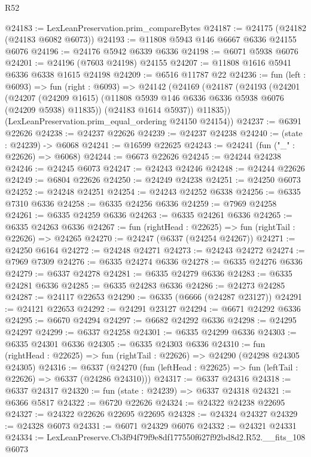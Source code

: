 \begin{lexlean}{R52}
\begin{coremodule}
@24183 := LexLeanPreservation.prim_compareBytes
@24187 := @24175 (@24182 (@24183 @6082 @6073))
@24193 := @11808 @5943 @146 @6667 @6336 @24155 @6076
@24196 := @24176 @5942 @6339 @6336
@24198 := @6071 @5938 @6076
@24201 := @24196 (@7603 @24198) @24155
@24207 := @11808 @1616 @5941 @6336 @6338 @1615 @24198
@24209 := @6516 @11787 @22
@24236 := fun (left : @6093) =>
  fun (right : @6093) =>
  @24142
    (@24169
      (@24187
        (@24193
          (@24201
            (@24207
              (@24209 @1615)
              (@11808 @5939 @146 @6336 @6336 @5938 @6076 (@24209 @5938) @11835))
            (@24183 @1614 @5937))
          @11835))
      (LexLeanPreservation.prim_equal_ordering @24150 @24154))
@24237 := @6391 @22626
@24238 := @24237 @22626
@24239 := @24237 @24238
@24240 := (state : @24239) -> @6068
@24241 := @16599 @22625
@24243 := @24241 (fun ("_" : @22626) => @6068)
@24244 := @6673 @22626
@24245 := @24244 @24238
@24246 := @24245 @6073
@24247 := @24243 @24246
@24248 := @24244 @22626
@24249 := @6804 @22626
@24250 := @24249 @24238
@24251 := @24250 @6073
@24252 := @24248 @24251
@24254 := @24243 @24252 @6338
@24256 := @6335 @7310 @6336
@24258 := @6335 @24256 @6336
@24259 := @7969 @24258
@24261 := @6335 @24259 @6336
@24263 := @6335 @24261 @6336
@24265 := @6335 @24263 @6336
@24267 := fun (rightHead : @22625) => fun (rightTail : @22626) => @24265
@24270 := @24247 (@6337 (@24254 @24267))
@24271 := @24250 @6164
@24272 := @24248 @24271
@24273 := @24243 @24272
@24274 := @7969 @7309
@24276 := @6335 @24274 @6336
@24278 := @6335 @24276 @6336
@24279 := @6337 @24278
@24281 := @6335 @24279 @6336
@24283 := @6335 @24281 @6336
@24285 := @6335 @24283 @6336
@24286 := @24273 @24285
@24287 := @24117 @22653
@24290 := @6335 (@6666 (@24287 @23127))
@24291 := @24121 @22653
@24292 := @24291 @23127
@24294 := @6671 @24292 @6336
@24295 := @6670 @24294
@24297 := @6682 @24292 @6336
@24298 := @24295 @24297
@24299 := @6337 @24258
@24301 := @6335 @24299 @6336
@24303 := @6335 @24301 @6336
@24305 := @6335 @24303 @6336
@24310 := fun (rightHead : @22625) => fun (rightTail : @22626) => @24290 (@24298 @24305 @24305)
@24316 := @6337
    (@24270 (fun (leftHead : @22625) => fun (leftTail : @22626) => @6337 (@24286 @24310)))
@24317 := @6337 @24316
@24318 := @6337 @24317
@24320 := fun (state : @24239) => @6337 @24318
@24321 := @6366 @5817
@24322 := @6720 @22626
@24324 := @24322 @24238 @22695
@24327 := @24322 @22626 @22695 @22695
@24328 := @24324 @24327
@24329 := @24328 @6073
@24331 := @6071 @24329 @6076
@24332 := @24321 @24331
@24334 := LexLeanPreserve.Cb3f94f79f9e8df177550f627f92bd8d2.R52.__fits_108 @6073

\end{coremodule}
\end{lexlean}
